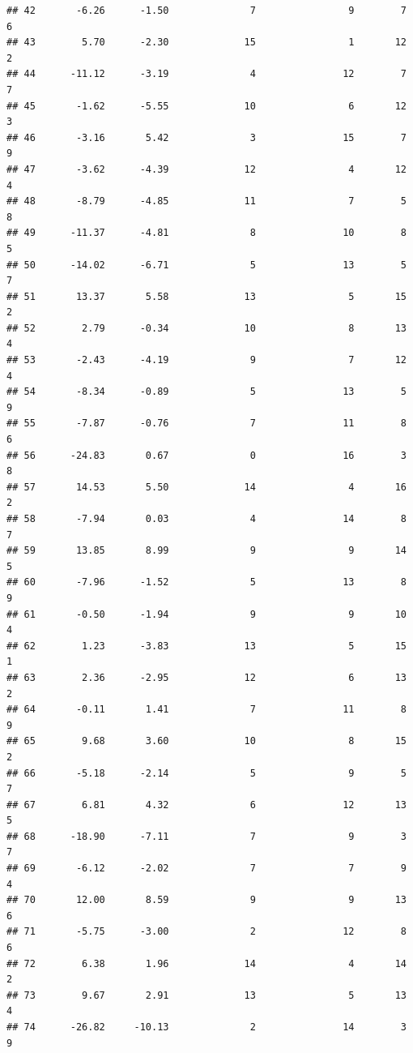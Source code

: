 \documentclass[]{book}
\begin{document}
\begin{verbatim}
## 42       -6.26      -1.50              7                9        7          6
## 43        5.70      -2.30             15                1       12          2
## 44      -11.12      -3.19              4               12        7          7
## 45       -1.62      -5.55             10                6       12          3
## 46       -3.16       5.42              3               15        7          9
## 47       -3.62      -4.39             12                4       12          4
## 48       -8.79      -4.85             11                7        5          8
## 49      -11.37      -4.81              8               10        8          5
## 50      -14.02      -6.71              5               13        5          7
## 51       13.37       5.58             13                5       15          2
## 52        2.79      -0.34             10                8       13          4
## 53       -2.43      -4.19              9                7       12          4
## 54       -8.34      -0.89              5               13        5          9
## 55       -7.87      -0.76              7               11        8          6
## 56      -24.83       0.67              0               16        3          8
## 57       14.53       5.50             14                4       16          2
## 58       -7.94       0.03              4               14        8          7
## 59       13.85       8.99              9                9       14          5
## 60       -7.96      -1.52              5               13        8          9
## 61       -0.50      -1.94              9                9       10          4
## 62        1.23      -3.83             13                5       15          1
## 63        2.36      -2.95             12                6       13          2
## 64       -0.11       1.41              7               11        8          9
## 65        9.68       3.60             10                8       15          2
## 66       -5.18      -2.14              5                9        5          7
## 67        6.81       4.32              6               12       13          5
## 68      -18.90      -7.11              7                9        3          7
## 69       -6.12      -2.02              7                7        9          4
## 70       12.00       8.59              9                9       13          6
## 71       -5.75      -3.00              2               12        8          6
## 72        6.38       1.96             14                4       14          2
## 73        9.67       2.91             13                5       13          4
## 74      -26.82     -10.13              2               14        3          9

\end{verbatim}
\end{document}
